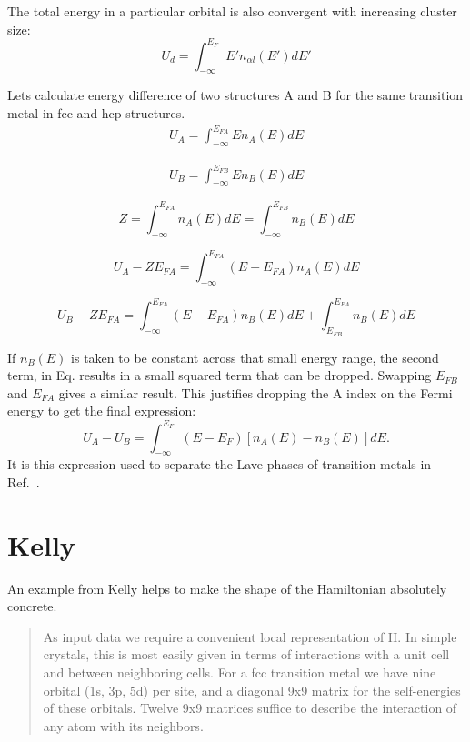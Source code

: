 \documentclass{article}
\begin{document}
The total energy in a particular orbital is also convergent with increasing cluster size:
%
\begin{equation}
U_{d} = \int_{-\infty}^{E_{F}}E'n_{\alpha l}(E') dE'
\end{equation}
%

Lets calculate energy difference of two structures A and B for the same transition metal
in fcc and hcp structures.
%
\begin{eqnarray}
\label{eq:Ua}
U_{A} = \int_{-\infty}^{E_{FA}} E n_{A}(E) dE
\end{eqnarray}

\begin{eqnarray}
\label{eq:Ub}
U_{B} = \int_{-\infty}^{E_{FB}} E n_{B}(E) dE
\end{eqnarray}

\begin{equation}
\label{eq:totaldos}
Z = \int_{-\infty}^{E_{FA}} n_{A}(E)dE = \int_{-\infty}^{E_{FB}}n_{B}(E)dE
\end{equation}

\begin{equation}
U_{A}-ZE_{FA}= \int_{-\infty}^{E_{FA}}(E-E_{FA})n_{A}(E)dE
\end{equation}

\begin{equation}
U_{B}-ZE_{FA}= \int_{-\infty}^{E_{FA}}(E-E_{FA})n_{B}(E)dE + \int_{E_{FB}}^{E_{FA}}n_{B}(E)dE
\end{equation}

If $n_{B}(E)$ is taken to be constant across that small energy range, the second term, in
Eq. results in a small squared term that can be dropped. Swapping $E_{FB}$ and $E_{FA}$ gives
a similar result. This justifies dropping the A index on the Fermi energy to get the
final expression:
%
\begin{equation}
U_{A}-U_{B} = \int_{-\infty}^{E_{F}}(E-E_{F})[n_{A}(E) -n_{B}(E)]dE.
\end{equation}
%
It is this expression used to separate the Lave phases of transition metals in  Ref.~\cite{haydock76}.

\section{Kelly}
An example from Kelly helps to make the shape of the Hamiltonian absolutely 
concrete.

\begin{quote}
As input data we require a convenient local representation of H. In simple crystals,
this is most easily given in terms of interactions with a unit cell and between neighboring cells.
For a fcc transition metal we have nine orbital (1s, 3p, 5d) per site, and a diagonal 9x9 matrix
for the self-energies of these orbitals. Twelve 9x9 matrices suffice to describe the interaction 
of any atom with its neighbors.
\end{quote}
\end{document}
